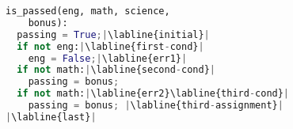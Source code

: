\begin{lstlisting}[language=Python,escapechar=|,style=mystyle]
is_passed(eng, math, science,
    bonus):
  passing = True;|\labline{initial}|
  if not eng:|\labline{first-cond}|
    eng = False;|\labline{err1}|
  if not math:|\labline{second-cond}|
    passing = bonus;
  if not math:|\labline{err2}\labline{third-cond}|
    passing = bonus; |\labline{third-assignment}|
|\labline{last}|
\end{lstlisting}
